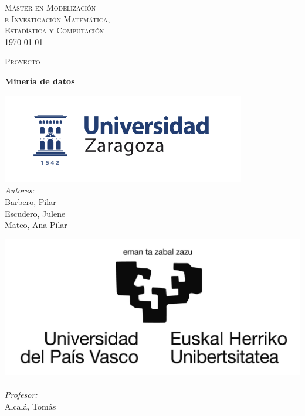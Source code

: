 \documentclass[a4paper,12pt]{article}
\author{Pilar Barbero Iriarte,
        Julene Escudero Argaluza, 
        Ana Pilar Mateo Sanz}
\begin{document}



\begin{titlepage}
\begin{center}



\textsc{\LARGE M\'aster en Modelizaci\'on \\e Investigaci\'on Matem\'atica,\\ Estad\'istica y Computaci\'on }\\[1.5cm]
{\large \today}

\textsc{Proyecto}\\[0.5cm]

\vfill

{ \huge \bfseries Miner\'ia de datos \\[0.4cm] }
\vfill



\noindent
\begin{minipage}{0.4\textwidth}
\begin{flushleft} \large
\includegraphics[width=0.8\textwidth]{logoUZ.png}~\\[1cm]
\emph{Autores:}\\
Barbero, Pilar \\
Escudero, Julene \\
Mateo, Ana Pilar\\
\end{flushleft}
\end{minipage}%
\begin{minipage}{0.4\textwidth}
\begin{flushright} \large
\includegraphics[width=1\textwidth]{logoUPV.png}~\\[1cm]
\emph{Profesor:} \\
Alcal\'a, Tomás
\end{flushright}
\end{minipage}

\end{center}


\end{titlepage}
\end{document}
